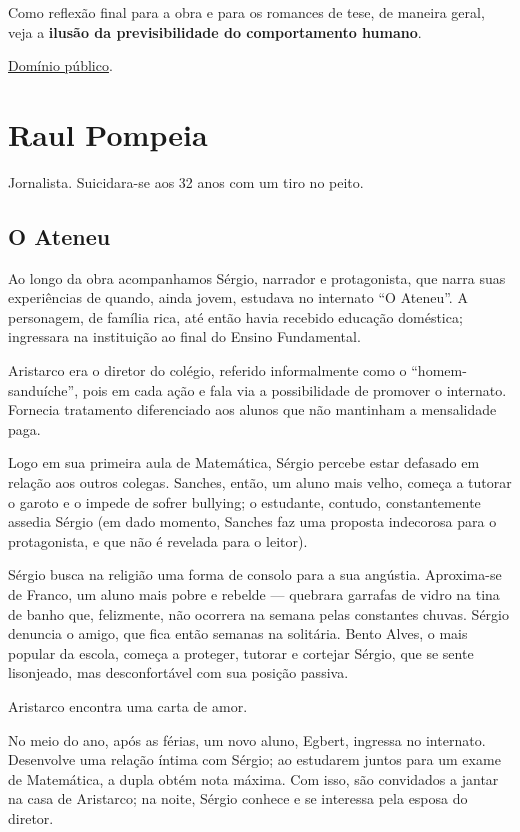 Como reflexão final para a obra e para os romances de tese, de maneira geral, veja a \textbf{ilusão da previsibilidade do comportamento humano}.

\href{http://www.dominiopublico.gov.br/download/texto/bv000015.pdf}{Domínio público}.

\section{Raul Pompeia}

Jornalista. Suicidara-se aos 32 anos com um tiro no peito.

\subsection{O Ateneu}

Ao longo da obra acompanhamos Sérgio, narrador e protagonista, que narra suas experiências de quando, ainda jovem, estudava no internato ``O Ateneu''. A personagem, de família rica, até então havia recebido educação doméstica; ingressara na instituição ao final do Ensino Fundamental.

Aristarco era o diretor do colégio, referido informalmente como o ``homem-sanduíche'', pois em cada ação e fala via a possibilidade de promover o internato. Fornecia tratamento diferenciado aos alunos que não mantinham a mensalidade paga.

Logo em sua primeira aula de Matemática, Sérgio percebe estar defasado em relação aos outros colegas. Sanches, então, um aluno mais velho, começa a tutorar o garoto e o impede de sofrer bullying; o estudante, contudo, constantemente assedia Sérgio (em dado momento, Sanches faz uma proposta indecorosa para o protagonista, e que não é revelada para o leitor).

Sérgio busca na religião uma forma de consolo para a sua angústia. Aproxima-se de Franco, um aluno mais pobre e rebelde — quebrara garrafas de vidro na tina de banho que, felizmente, não ocorrera na semana pelas constantes chuvas. Sérgio denuncia o amigo, que fica então semanas na solitária. Bento Alves, o mais popular da escola, começa a proteger, tutorar e cortejar Sérgio, que se sente lisonjeado, mas desconfortável com sua posição passiva.

Aristarco encontra uma carta de amor.

No meio do ano, após as férias, um novo aluno, Egbert,  ingressa no internato. Desenvolve uma relação íntima com Sérgio; ao estudarem juntos para um exame de Matemática, a dupla obtém nota máxima. Com isso, são convidados a jantar na casa de Aristarco; na noite, Sérgio conhece e se interessa pela esposa do diretor.

